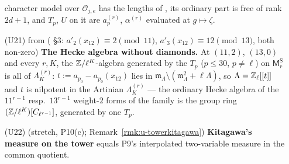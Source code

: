 \documentclass[11pt]{article}
\newcommand{\Iw}{\Lambda}                         %
\newcommand{\cusp}{\mathrm{S}}
\newcommand{\Zl}{\Z_\ell}
\newcommand{\IwT}[2]{\Iw^{(#2)}_{#1}}                 %
\begin{document}
\begin{prediction}
\begin{enumerate}
  character model over $\mathcal O_{j,e}$ has the lengths of , its ordinary part is free of rank $2d+1$, and $T_p$, $U$ on it are $a^{(r)}_p$, $\alpha^{(r)}$ evaluated at $g\mapsto\zeta$.
\item[(U21)] \PROVED{} from \COMP{} ( \S3: $a'_2(x_{12})\equiv2\pmod{11}$, $a'_3(x_{12})\equiv12\pmod{13}$, both non-zero) \textbf{The Hecke algebra without diamonds.} At $(11,2)$, $(13,0)$ and every
  $r,K$, the $\mathbb{Z}/\ell^{K}$-algebra generated by the $T_p$ ($p\le30$, $p\ne\ell$) on $\mathsf M^{\cusp}_r$ is all of $\IwT Kr$: $t:=a_{p_0}-a_{p_0}(x_{12})$ lies in $\mathfrak m_\Iw\setminus(\mathfrak m_\Iw^{2}+\ell\Iw)$, so
  $\Iw=\Zl[[t]]$ and $t$ is nilpotent in the Artinian $\IwT Kr$ --- the ordinary Hecke algebra of the $11^{r-1}$ resp.\ $13^{r-1}$ weight-$2$ forms of the family is the group ring $(\mathbb{Z}/\ell^{K})[C_{\ell^{r-1}}]$,
  generated by one $T_p$.
\item[(U22)] \CONJ{} (stretch, P10(c); Remark~\ref{rmk:u-towerkitagawa}) \textbf{Kitagawa's measure on the tower} equals P9's interpolated two-variable measure in the common quotient.
\end{enumerate}
\end{prediction}
\end{document}
